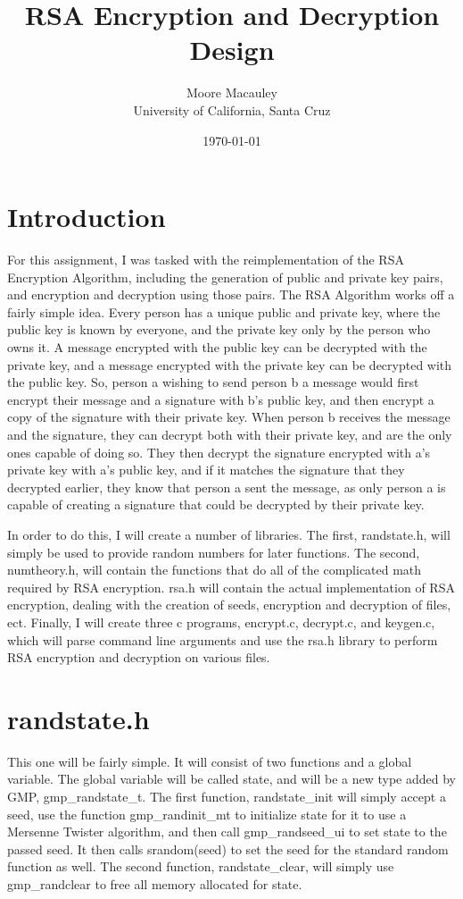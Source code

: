 \documentclass[11pt]{article}
\title{RSA Encryption and Decryption Design}
\author{Moore Macauley \\ University of California, Santa Cruz}
\date{\today}
\begin{document}
\maketitle

\section{Introduction}

For this assignment, I was tasked with the reimplementation of the RSA Encryption Algorithm, including the generation of public and private key pairs, and encryption and decryption using those pairs. The RSA Algorithm works off a fairly simple idea. Every person has a unique public and private key, where the public key is known by everyone, and the private key only by the person who owns it. A message encrypted with the public key can be decrypted with the private key, and a message encrypted with the private key can be decrypted with the public key. So, person a wishing to send person b a message would first encrypt their message and a signature with b's public key, and then encrypt a copy of the signature with their private key. When person b receives the message and the signature, they can decrypt both with their private key, and are the only ones capable of doing so. They then decrypt the signature encrypted with a's private key with a's public key, and if it matches the signature that they decrypted earlier, they know that person a sent the message, as only person a is capable of creating a signature that could be decrypted by their private key.

In order to do this, I will create a number of libraries. The first, randstate.h, will simply be used to provide random numbers for later functions. The second, numtheory.h, will contain the functions that do all of the complicated math required by RSA encryption. rsa.h will contain the actual implementation of RSA encryption, dealing with the creation of seeds, encryption and decryption of files, ect. Finally, I will create three c programs, encrypt.c, decrypt.c, and keygen.c, which will parse command line arguments and use the rsa.h library to perform RSA encryption and decryption on various files.

\section{randstate.h}

This one will be fairly simple. It will consist of two functions and a global variable. The global variable will be called state, and will be a new type added by GMP, gmp\_randstate\_t. The first function, randstate\_init will simply accept a seed, use the function gmp\_randinit\_mt to initialize state for it to use a Mersenne Twister algorithm, and then call gmp\_randseed\_ui to set state to the passed seed. It then calls srandom(seed) to set the seed for the standard random function as well. The second function, randstate\_clear, will simply use gmp\_randclear to free all memory allocated for state.
\end{document}
